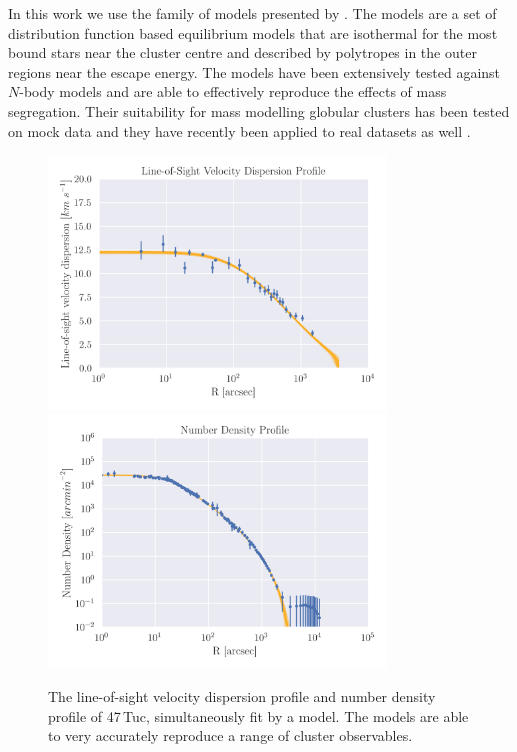 In this work we use the  family of models presented by \citet{Gieles2015}. The
 models are a set of distribution function based equilibrium models that are isothermal
for the most bound stars near the cluster centre and described by polytropes in the outer regions
near the escape energy. The models have been extensively tested against $N$-body models
\citep{Zocchi2016, Peuten2017} and are able to effectively reproduce the effects of mass
segregation. Their suitability for mass modelling globular clusters has been tested on mock data
\citep{Henault-Brunet2019} and they have recently been applied to real datasets as well
\citep[e.g.][]{Gieles2018, Henault-Brunet2020}.


\begin{figure}
	\centering
	\includegraphics[width=0.8\textwidth]{"./figures/limepy_veldisp.png"}
	\includegraphics[width=0.8\textwidth]{"./figures/limepy_numdens.png"}
	\caption{The line-of-sight velocity dispersion profile and number density profile of
		47\,Tuc, simultaneously fit by a  model. The  models are able to
		very accurately reproduce a range of cluster observables.}
	\label{fig:1/limepy_models}
\end{figure}


